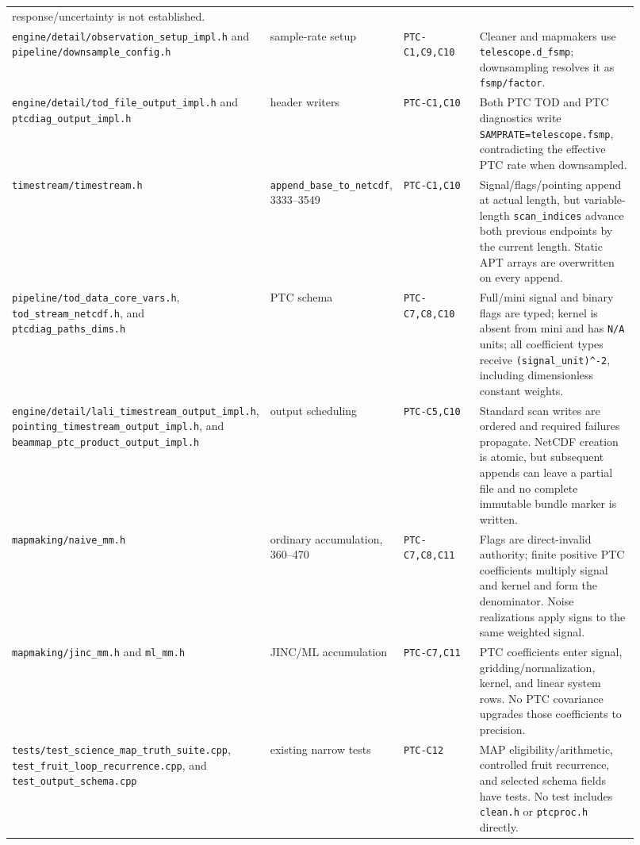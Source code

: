 \documentclass[11pt]{article}
\newcommand{\code}[1]{\nolinkurl{#1}}
\begin{document}
\begin{longtable}{L{0.255\linewidth}L{0.145\linewidth}L{0.19\linewidth}L{0.33\linewidth}}
response/uncertainty is not established.\\
\code{engine/detail/observation_setup_impl.h} and
\code{pipeline/downsample_config.h} &
sample-rate setup &
\code{PTC-C1,C9,C10} &
Cleaner and mapmakers use \code{telescope.d_fsmp}; downsampling resolves it as
\code{fsmp/factor}.\\
\code{engine/detail/tod_file_output_impl.h} and
\code{ptcdiag_output_impl.h} &
header writers &
\code{PTC-C1,C10} &
Both PTC TOD and PTC diagnostics write
\code{SAMPRATE=telescope.fsmp}, contradicting the effective PTC rate when
downsampled.\\
\code{timestream/timestream.h} &
\code{append_base_to_netcdf}, 3333--3549 &
\code{PTC-C1,C10} &
Signal/flags/pointing append at actual length, but variable-length
\code{scan_indices} advance both previous endpoints by the current length.
Static APT arrays are overwritten on every append.\\
\code{pipeline/tod_data_core_vars.h},
\code{tod_stream_netcdf.h}, and \code{ptcdiag_paths_dims.h} &
PTC schema &
\code{PTC-C7,C8,C10} &
Full/mini signal and binary flags are typed; kernel is absent from mini and has
\code{N/A} units; all coefficient types receive
\code{(signal_unit)^-2}, including dimensionless constant weights.\\
\code{engine/detail/lali_timestream_output_impl.h},
\code{pointing_timestream_output_impl.h}, and
\code{beammap_ptc_product_output_impl.h} &
output scheduling &
\code{PTC-C5,C10} &
Standard scan writes are ordered and required failures propagate.  NetCDF
creation is atomic, but subsequent appends can leave a partial file and no
complete immutable bundle marker is written.\\
\code{mapmaking/naive_mm.h} &
ordinary accumulation, 360--470 &
\code{PTC-C7,C8,C11} &
Flags are direct-invalid authority; finite positive PTC coefficients multiply
signal and kernel and form the denominator.  Noise realizations apply signs to
the same weighted signal.\\
\code{mapmaking/jinc_mm.h} and \code{ml_mm.h} &
JINC/ML accumulation &
\code{PTC-C7,C11} &
PTC coefficients enter signal, gridding/normalization, kernel, and linear
system rows.  No PTC covariance upgrades those coefficients to precision.\\
\code{tests/test_science_map_truth_suite.cpp},
\code{test_fruit_loop_recurrence.cpp}, and
\code{test_output_schema.cpp} &
existing narrow tests &
\code{PTC-C12} &
MAP eligibility/arithmetic, controlled fruit recurrence, and selected schema
fields have tests.  No test includes \code{clean.h} or \code{ptcproc.h}
directly.\\
\bottomrule
\end{longtable}
\end{document}
